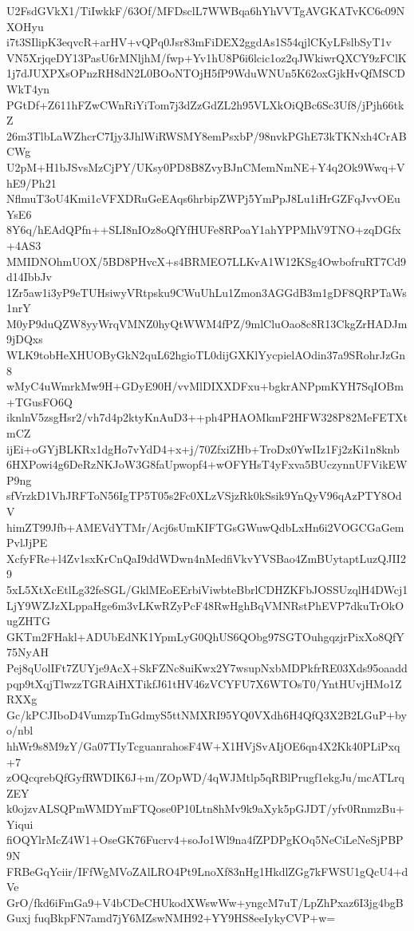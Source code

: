 U2FsdGVkX1/TiIwkkF/63Of/MFDsclL7WWBqa6hYhVVTgAVGKATvKC6c09NXOHyu
i7t3SIlipK3eqvcR+arHV+vQPq0Jsr83mFiDEX2ggdAs1S54qjlCKyLFslbSyT1v
VN5XrjqeDY13PasU6rMNljhM/fwp+Yv1hU8P6i6lcic1oz2qJWkiwrQXCY9zFClK
1j7dJUXPXsOPnzRH8dN2L0BOoNTOjH5fP9WduWNUn5K62oxGjkHvQfMSCDWkT4yn
PGtDf+Z611hFZwCWnRiYiTom7j3dZzGdZL2h95VLXkOiQBc6Sc3Uf8/jPjh66tkZ
26m3TlbLaWZhcrC7Ijy3JhlWiRWSMY8emPsxbP/98nvkPGhE73kTKNxh4CrABCWg
U2pM+H1bJSvsMzCjPY/UKsy0PD8B8ZvyBJnCMemNmNE+Y4q2Ok9Wwq+VhE9/Ph21
NflmuT3oU4Kmi1cVFXDRuGeEAqs6hrbipZWPj5YmPpJ8Lu1iHrGZFqJvvOEuYsE6
8Y6q/hEAdQPfn++SLI8nIOz8oQfYfHUFe8RPoaY1ahYPPMhV9TNO+zqDGfx+4AS3
MMIDNOhmUOX/5BD8PHvcX+s4BRMEO7LLKvA1W12KSg4OwbofruRT7Cd9d14IbbJv
1Zr5aw1i3yP9eTUHsiwyVRtpsku9CWuUhLu1Zmon3AGGdB3m1gDF8QRPTaWs1nrY
M0yP9duQZW8yyWrqVMNZ0hyQtWWM4fPZ/9mlCluOao8c8R13CkgZrHADJm9jDQxs
WLK9tobHeXHUOByGkN2quL62hgioTL0dijGXKlYycpielAOdin37a9SRohrJzGn8
wMyC4uWmrkMw9H+GDyE90H/vvMlDIXXDFxu+bgkrANPpmKYH7SqIOBm+TGusFO6Q
iknlnV5zsgHsr2/vh7d4p2ktyKnAuD3++ph4PHAOMkmF2HFW328P82MeFETXtmCZ
ijEi+oGYjBLKRx1dgHo7vYdD4+x+j/70ZfxiZHb+TroDx0YwIIz1Fj2zKi1n8knb
6HXPowi4g6DeRzNKJoW3G8faUpwopf4+wOFYHsT4yFxva5BUczynnUFVikEWP9ng
sfVrzkD1VhJRFToN56IgTP5T05s2Fc0XLzVSjzRk0kSsik9YnQyV96qAzPTY8OdV
himZT99Jfb+AMEVdYTMr/Acj6sUmKIFTGsGWuwQdbLxHn6i2VOGCGaGemPvlJjPE
XcfyFRe+l4Zv1sxKrCnQaI9ddWDwn4nMedfiVkvYVSBao4ZmBUytaptLuzQJII29
5xL5XtXcEtlLg32feSGL/GklMEoEErbiViwbteBbrlCDHZKFbJOSSUzqlH4DWcj1
LjY9WZJzXLppaHge6m3vLKwRZyPcF48RwHghBqVMNRstPhEVP7dkuTrOkOugZHTG
GKTm2FHakl+ADUbEdNK1YpmLyG0QhUS6QObg97SGTOuhgqzjrPixXo8QfY75NyAH
Pej8qUolIFt7ZUYje9AcX+SkFZNc8uiKwx2Y7wsupNxbMDPkfrRE03Xds95oaadd
pqp9tXqjTlwzzTGRAiHXTikfJ61tHV46zVCYFU7X6WTOsT0/YntHUvjHMo1ZRXXg
Gc/kPCJIboD4VumzpTnGdmyS5ttNMXRI95YQ0VXdh6H4QfQ3X2B2LGuP+byo/nbl
hhWr9s8M9zY/Ga07TIyTcguanrahosF4W+X1HVjSvAIjOE6qn4X2Kk40PLiPxq+7
zOQcqrebQfGyfRWDIK6J+m/ZOpWD/4qWJMtlp5qRBlPrugf1ekgJu/mcATLrqZEY
k0ojzvALSQPmWMDYmFTQose0P10Ltn8hMv9k9aXyk5pGJDT/yfv0RnmzBu+Yiqui
fiOQYlrMcZ4W1+OseGK76Fucrv4+soJo1Wl9na4fZPDPgKOq5NeCiLeNeSjPBP9N
FRBeGqYciir/IFfWgMVoZAlLRO4Pt9LnoXf83nHg1HkdlZGg7kFWSU1gQcU4+dVe
GrO/fkd6iFmGa9+V4bCDeCHUkodXWswWw+yngcM7uT/LpZhPxaz6I3jg4bgBGuxj
fuqBkpFN7amd7jY6MZswNMH92+YY9HS8eeIykyCVP+w=

